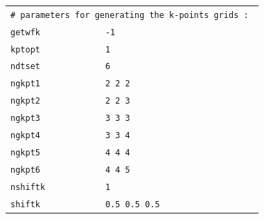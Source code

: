 \documentclass[11pt,a4paper]{article}
\begin{document}
\begin{center}
\begin{tabular}{lll}
\multicolumn{3}{l}{\texttt{\# parameters for generating the k-points grids : }}\\
\texttt{getwfk} & \texttt{-1}&\\
\texttt{kptopt} & \texttt{1} &\\
\texttt{ndtset} & \texttt{6}&\\
\texttt{ngkpt1} & \texttt{2 2 2}&\\
\texttt{ngkpt2} & \texttt{2 2 3}&\\
\texttt{ngkpt3} & \texttt{3 3 3}&\\
\texttt{ngkpt4} & \texttt{3 3 4}&\\
\texttt{ngkpt5} & \texttt{4 4 4}&\\
\texttt{ngkpt6} & \texttt{4 4 5}&\\
\texttt{nshiftk} &\texttt{1}&\\
\texttt{shiftk} &\texttt{0.5 0.5 0.5}&
\end{tabular}
\end{center} 
\end{document}
